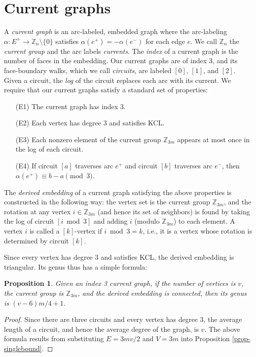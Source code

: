 \documentclass[12pt]{article}
\theoremstyle{plain}
\newtheorem{proposition}[theorem]{Proposition}
\newcommand{\Z}{\mathbb{Z}}
\begin{document}
\section{Current graphs}

A \emph{current graph} is an arc-labeled, embedded graph where the arc-labeling $\alpha: E^+ \to \Z_n \setminus \{0\}$ satisfies $\alpha(e^+) = -\alpha(e^-)$ for each edge $e$. We call $\Z_n$ the \emph{current group} and the arc labels \emph{currents}. The \emph{index} of a current graph is the number of faces in the embedding. Our current graphs are of index 3, and its face-boundary walks, which we call \emph{circuits}, are labeled $[0]$, $[1]$, and $[2]$. Given a circuit, the \emph{log} of the circuit replaces each arc with its current. We require that our current graphs satisfy a standard set of properties:

\begin{enumerate}
\item[(E1)] The current graph has index 3. 
\item[(E2)] Each vertex has degree 3 and satisfies KCL.
\item[(E3)] Each nonzero element of the current group $\Z_{3m}$ appears at most once in the log of each circuit. 
\item[(E4)] If circuit $[a]$ traverses arc $e^+$ and circuit $[b]$ traverses arc $e^-$, then $\alpha(e^+) \equiv b-a \pmod{3}$. 
\end{enumerate}

The \emph{derived embedding} of a current graph satisfying the above properties is constructed in the following way: the vertex set is the current group $\Z_{3m}$, and the rotation at any vertex $i \in \Z_{3m}$ (and hence its set of neighbors) is found by taking the log of circuit $[i \bmod{3}]$ and adding $i$ (modulo $\Z_{3m}$) to each element. A vertex $i$ is called a $[k]$-vertex if $i \bmod{3} = k$, i.e., it is a vertex whose rotation is determined by circuit $[k]$. 

Since every vertex has degree 3 and satisfies KCL, the derived embedding is triangular. Its genus thus has a simple formula:

\begin{proposition}
Given an index 3 current graph, if the number of vertices is $v$, the current group is $\Z_{3m}$, and the derived embedding is connected, then its genus is $(v-6)m/4+1$.
\label{prop-cgenus}
\end{proposition}
\begin{proof}
Since there are three circuits and every vertex has degree 3, the average length of a circuit, and hence the average degree of the graph, is $v$. The above formula results from substituting $E = 3mv/2$ and $V = 3m$ into Proposition \ref{prop-singlebound}.
\end{proof}
\end{document}
